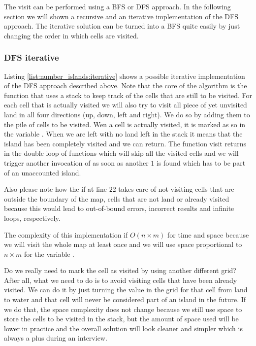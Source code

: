 The visit can be performed using a BFS or DFS approach. In the following section we will shown a recursive and an iterative implementation of the DFS approach. The iterative solution can be turned into a BFS quite easily by just changing the order in which cells are visited.


\subsubsection{DFS iterative}
Listing \ref{list:number_islands:iterative} shows a possible iterative implementation of the DFS approach described above. Note that the core of the algorithm is the function  that uses a stack to keep track of the cells that are still to be visited. For each cell that is actually visited we will also try to visit all piece of yet unvisited land in all four directions (up, down, left and right). We do so by adding them to the pile of cells to be visited. Wen a cell is actually visited, it is marked as so in the variable .
When we are left with no land left in the stack it means that the island has been completely visited and we can return. 
The function visit returns in the double loop of functions  which will skip all the visited cells and we will trigger another invocation of  as soon as another $1$ is found which has to be part of an unaccounted island.


Also please note how the if at line $22$ takes care of not visiting cells that are outside the boundary of the map, cells that are not land or already visited because this would lead to out-of-bound errors, incorrect results and infinite loops, respectively.

The complexity of this implementation if $O(n\times m)$ for time and space because we will visit the whole map at least once and we will use space proportional to $n\times m$ for the variable .



Do we really need to mark the cell as visited by using another different grid? After all, what we need to do is to avoid visiting cells that have been already visited. We can do it by just turning the value in the grid for that cell from land to water and that cell will never be considered part of an island in the future. If we do that, the space complexity does not change because we still use space to store the cells to be visited in the stack, but the amount of space used will be lower in practice and the overall solution will look cleaner and simpler which is always a plus during an interview. 

